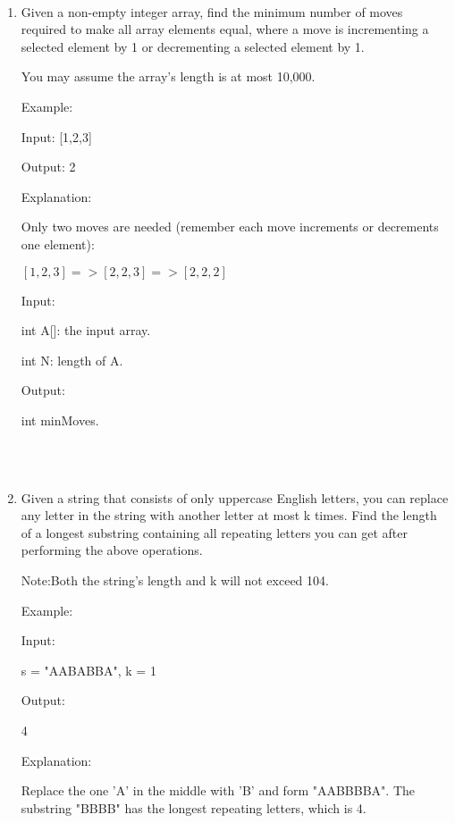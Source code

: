 \documentclass[12pt,a4paper]{article}
\begin{document}
\noindent

\noindent{}
~\\
\begin{enumerate}

\item Given a non-empty integer array, find the minimum number of moves required to make all array elements equal, where a move is incrementing a selected element by 1 or decrementing a selected element by 1.

You may assume the array's length is at most 10,000.

Example:

Input:
[1,2,3]

Output:
2

Explanation:

Only two moves are needed (remember each move increments or decrements one element):

$[1,2,3] => [2,2,3] => [2,2,2]$

Input:

int A[]: the input array.

int N: length of A.

Output:

int minMoves.


~\\
~\\


\item Given a string that consists of only uppercase English letters, you can replace any letter in the string with another letter at most k times. Find the length of a longest substring containing all repeating letters you can get after performing the above operations.
    
Note:Both the string's length and k will not exceed 104.

Example:

Input:

s = "AABABBA", k = 1

Output:

4

Explanation:

Replace the one 'A' in the middle with 'B' and form "AABBBBA".
The substring "BBBB" has the longest repeating letters, which is 4.


\end{enumerate}
\end{document}
